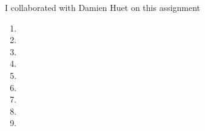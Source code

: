 \documentclass[letterpaper,11pt]{article}
\begin{document}
I collaborated with Damien Huet on this assignment
\begin{enumerate}
\item 
\item 
\item 
\item 
\item 
\item 
\item 
\item 
\item 
\end{enumerate}
\end{document}
